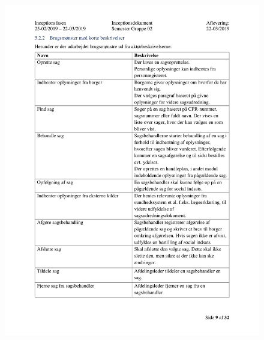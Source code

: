 \begin{figure}[hb]
  \includegraphics[scale = 0.33]{./PNG/Inceptions/Gruppe02+InceptionsDokument-10.jpg} 
\end{figure}

